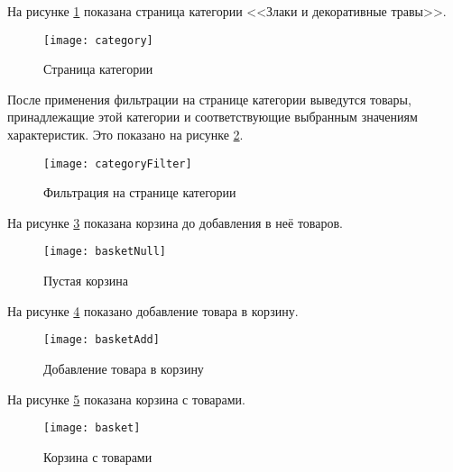 На рисунке \ref{category:image} показана страница категории <<Злаки и декоративные травы>>.

\begin{figure}[H]
	\texttt{[image: category]}
	\caption{Страница категории}
	\label{category:image}
\end{figure}

После применения фильтрации на странице категории выведутся товары, принадлежащие этой категории и соответствующие выбранным значениям характеристик. Это показано на рисунке \ref{categoryFilter:image}.

\begin{figure}[H]
	\texttt{[image: categoryFilter]}
	\caption{Фильтрация на странице категории}
	\label{categoryFilter:image}
\end{figure}


На рисунке \ref{basketNull:image} показана корзина до добавления в неё товаров.

\begin{figure}[H]
	\texttt{[image: basketNull]}
	\caption{Пустая корзина}
	\label{basketNull:image}
\end{figure}

На рисунке \ref{basketAdd:image} показано добавление товара в корзину.

\begin{figure}[H]
	\texttt{[image: basketAdd]}
	\caption{Добавление товара в корзину}
	\label{basketAdd:image}
\end{figure}

На рисунке \ref{basket:image} показана корзина с товарами.

\begin{figure}[H]
	\texttt{[image: basket]}
	\caption{Корзина с товарами}
	\label{basket:image}
\end{figure}

